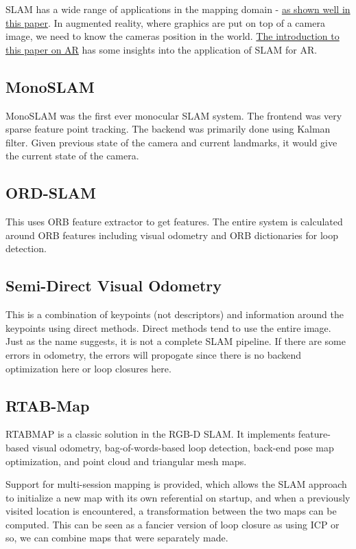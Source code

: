 SLAM has a wide range of applications in the mapping domain - \href{http://www.informatik.uni-bremen.de/agebv2/downloads/published/freseki10.pdf}{as shown well in this paper}. In augmented reality, where graphics are put on top of a camera image, we need to know the cameras position in the world. \href{https://sci-hub.tw/10.1109/ISMAR.2007.4538852}{The introduction to this paper on AR} has some insights into the application of SLAM for AR.

\subsection*{MonoSLAM}

MonoSLAM was the first ever monocular SLAM system. The frontend was very sparse feature point tracking. The backend was primarily done using Kalman filter. Given previous state of the camera and current landmarks, it would give the current state of the camera. 

\subsection*{ORD-SLAM}

This uses ORB feature extractor to get features. The entire system is calculated around ORB features including visual odometry and ORB dictionaries for loop detection.

\subsection*{Semi-Direct Visual Odometry}

This is a combination of keypoints (not descriptors) and information around the keypoints using direct methods. Direct methods tend to use the entire image. Just as the name suggests, it is not a complete SLAM pipeline. If there are some errors in odometry, the errors will propogate since there is no backend optimization here or loop closures here.

\subsection*{RTAB-Map}

RTABMAP is a classic solution in the RGB-D SLAM. It implements feature-based visual odometry, bag-of-words-based loop detection, back-end pose map optimization, and point cloud and triangular mesh maps. 

Support for multi-session mapping is provided, which allows the SLAM approach to initialize a new map with its own referential on startup, and when a previously visited location is encountered, a transformation between the two maps can be computed. This can be seen as a fancier version of loop closure as using ICP or so, we can combine maps that were separately made.

